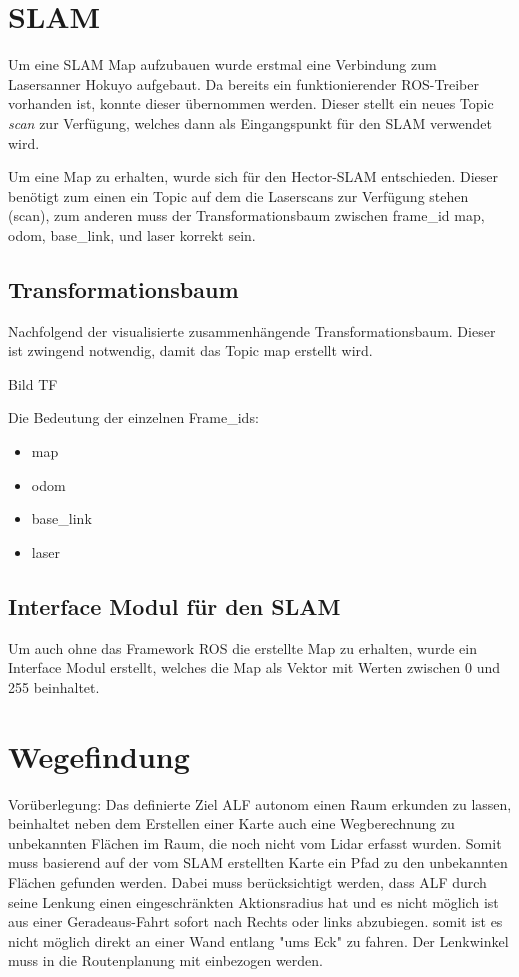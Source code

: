 \section{SLAM}

Um eine SLAM Map aufzubauen wurde erstmal eine Verbindung zum Lasersanner Hokuyo aufgebaut. Da bereits ein funktionierender ROS-Treiber vorhanden ist, konnte dieser übernommen werden. Dieser stellt ein neues Topic \textit{scan} zur Verfügung, welches dann als Eingangspunkt für den SLAM verwendet wird. 

Um eine Map zu erhalten, wurde sich für den Hector-SLAM entschieden. Dieser benötigt zum einen ein Topic auf dem die Laserscans zur Verfügung stehen (scan), zum anderen muss der Transformationsbaum zwischen frame\_id map, odom, base\_link, und laser korrekt sein.  

\subsection{Transformationsbaum}

Nachfolgend der visualisierte zusammenhängende Transformationsbaum. Dieser ist zwingend notwendig, damit das Topic map erstellt wird. 

Bild TF

Die Bedeutung der einzelnen Frame\_ids:

\begin{itemize}
\item map
\item odom
\item base\_link
\item laser
\end{itemize}


\subsection{Interface Modul für den SLAM}

Um auch ohne das Framework ROS die erstellte Map zu erhalten, wurde ein Interface Modul erstellt, welches die Map als Vektor mit Werten zwischen 0 und 255 beinhaltet. 



\section{Wegefindung}


Vorüberlegung:
Das definierte Ziel ALF autonom einen Raum erkunden zu lassen, beinhaltet neben dem Erstellen einer Karte auch eine Wegberechnung zu unbekannten Flächen im Raum, die noch nicht vom Lidar erfasst wurden. Somit muss basierend auf der vom SLAM erstellten Karte ein Pfad zu den unbekannten Flächen gefunden werden.
Dabei muss berücksichtigt werden, dass ALF durch seine Lenkung einen eingeschränkten Aktionsradius hat und es nicht möglich ist aus einer Geradeaus-Fahrt sofort nach Rechts oder links abzubiegen. somit ist es nicht möglich direkt an einer Wand entlang "ums Eck" zu fahren. Der Lenkwinkel muss in die Routenplanung mit einbezogen werden. 

